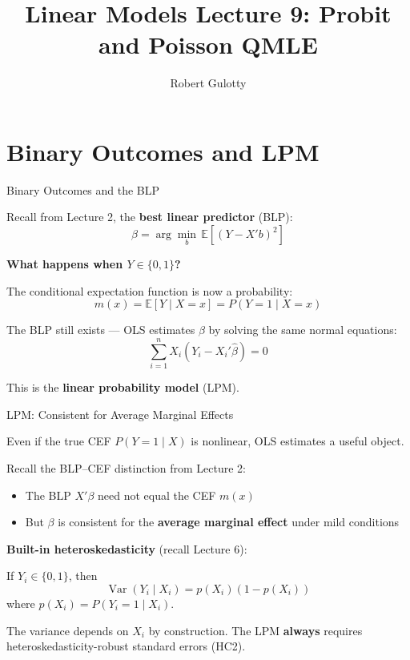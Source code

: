 \documentclass[aspectratio=169]{beamer}
\title[PLSC 30700]{Linear Models Lecture 9: Probit and Poisson QMLE}
\author{Robert Gulotty}
\institute[Chicago]{University of Chicago}
\numberwithin{equation}{section}
\begin{document}
\begin{frame}
\maketitle
\end{frame}

\section{Binary Outcomes and LPM}

\begin{frame}{Binary Outcomes and the BLP}

Recall from Lecture 2, the \textbf{best linear predictor} (BLP):
\[
\beta = \arg\min_b \, \mathbb{E}\left[(Y - X'b)^2\right]
\]

\pause

\textbf{What happens when $Y \in \{0,1\}$?}

\pause

The conditional expectation function is now a probability:
\[
m(x) = \mathbb{E}[Y \mid X = x] = P(Y = 1 \mid X = x)
\]

\pause

The BLP still exists --- OLS estimates $\beta$ by solving the same normal equations:
\[
\sum_{i=1}^n X_i(Y_i - X_i'\hat\beta) = 0
\]

This is the \textbf{linear probability model} (LPM).

\end{frame}


\begin{frame}{LPM: Consistent for Average Marginal Effects}

Even if the true CEF $P(Y=1 \mid X)$ is nonlinear, OLS estimates a useful object.

\pause

Recall the BLP--CEF distinction from Lecture 2:
\begin{itemize}
    \item The BLP $X'\beta$ need not equal the CEF $m(x)$
    \item But $\beta$ is consistent for the \textbf{average marginal effect} under mild conditions
\end{itemize}

\pause

\textbf{Built-in heteroskedasticity} (recall Lecture 6):

If $Y_i \in \{0,1\}$, then
\[
\operatorname{Var}(Y_i \mid X_i) = p(X_i)(1 - p(X_i))
\]
where $p(X_i) = P(Y_i = 1 \mid X_i)$.

\pause

The variance depends on $X_i$ by construction. The LPM \textbf{always} requires heteroskedasticity-robust standard errors (HC2).

\end{frame}
\end{document}
